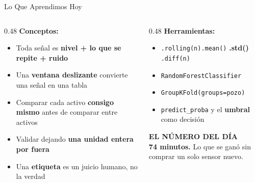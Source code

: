 \documentclass[aspectratio=169, 11pt]{beamer}
\begin{document}
\begin{frame}[shrink=10]{Lo Que Aprendimos Hoy}
  \vspace{-4pt}
  \begin{columns}[T]
    \begin{column}{0.48\textwidth}
      {\small\color{arcaDark}\bfseries\faLightbulb[regular]\hspace{5pt}Conceptos:}
      \vspace{4pt}
      {\footnotesize\color{textMuted}
      \begin{itemize}\setlength{\itemsep}{3pt}
        \item[{\color{codeGreen}\scriptsize\faCheck}]
          Toda señal es \textbf{nivel + lo que se repite + ruido}
        \item[{\color{codeGreen}\scriptsize\faCheck}]
          Una \textbf{ventana deslizante} convierte una señal en una tabla
        \item[{\color{codeGreen}\scriptsize\faCheck}]
          Comparar cada activo \textbf{consigo mismo} antes de comparar
          entre activos
        \item[{\color{codeGreen}\scriptsize\faCheck}]
          Validar dejando \textbf{una unidad entera por fuera}
        \item[{\color{codeGreen}\scriptsize\faCheck}]
          Una \textbf{etiqueta} es un juicio humano, no la verdad
      \end{itemize}}
    \end{column}
    \begin{column}{0.48\textwidth}
      {\small\color{arcaDark}\bfseries\faTools\hspace{5pt}Herramientas:}
      \vspace{4pt}
      {\footnotesize\color{textMuted}
      \begin{itemize}\setlength{\itemsep}{3pt}
        \item[{\color{arcaRed}\scriptsize\faArrowRight}]
          \texttt{.rolling(n).mean()} \textbf{.std()} \texttt{.diff(n)}
        \item[{\color{arcaRed}\scriptsize\faArrowRight}]
          \texttt{RandomForestClassifier}
        \item[{\color{arcaRed}\scriptsize\faArrowRight}]
          \texttt{GroupKFold(groups=pozo)}
        \item[{\color{arcaRed}\scriptsize\faArrowRight}]
          \texttt{predict\_proba} y el \textbf{umbral} como decisión
      \end{itemize}}
      \vspace{6pt}
      \begin{tcolorbox}[colback=arcaGray, colframe=arcaRed, boxrule=0pt, leftrule=3pt,
        arc=3pt, left=6pt, right=6pt, top=4pt, bottom=4pt]
        {\scriptsize\color{arcaRed}\bfseries EL NÚMERO DEL DÍA}\\[3pt]
        {\scriptsize\color{textMuted}
         \textbf{74 minutos.} Lo que se ganó sin comprar un solo sensor
         nuevo.}
      \end{tcolorbox}
    \end{column}
  \end{columns}
\end{frame}
\end{document}
